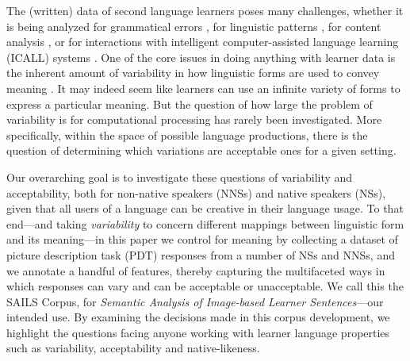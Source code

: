 \documentclass[11pt,a4paper]{article}
\newcommand{\md}[1]{\marginpar{\scriptsize MD: #1}}
\newcommand{\lk}[1]{\marginpar{\scriptsize LK: #1}}
\renewcommand{\marginpar}[1]{}
\begin{document}

The (written) data of second language learners poses many challenges, whether it is being analyzed for grammatical errors \citep{leacock:ea:14}, for linguistic patterns \citep{kyle2015automatically}, for content analysis \citep{weigle2013english}, or for interactions with intelligent computer-assisted language learning (ICALL) systems \citep{amaral:meurers:user:07}. One of the core issues in doing anything with learner data is the inherent amount of variability in how linguistic forms are used to convey meaning \citep[cf., e.g.,][]{Meurers.Dickinson-17}. It may indeed seem like learners can use an infinite variety of forms to express a particular meaning. 
%
But the question of how large the problem of variability is for computational processing has rarely been investigated. More specifically, within the space of possible language productions, there is the question of determining which variations are acceptable ones for a given setting.

Our overarching goal is to investigate these questions of variability and acceptability, both for non-native speakers (NNSs) and native speakers (NSs), given that all users of a language can be creative in their language usage.
%
To that end---and taking \textit{variability} to concern different mappings between linguistic form and its meaning---in this paper we control for meaning by collecting a dataset of picture description task (PDT) responses from a number of NSs and NNSs, and we annotate a handful of features, thereby capturing the multifaceted ways in which responses can vary and can be acceptable or unacceptable. We call this the SAILS Corpus, for \textit{Semantic Analysis of Image-based Learner Sentences}---our intended use. 
By examining the decisions made in this corpus development, we highlight the questions facing anyone working with learner language properties such as variability, acceptability and native-likeness. 
\end{document}

